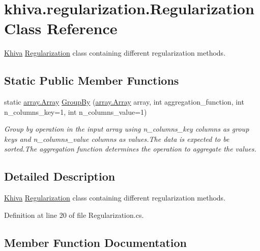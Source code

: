 \hypertarget{classkhiva_1_1regularization_1_1_regularization}{}\section{khiva.\+regularization.\+Regularization Class Reference}
\label{classkhiva_1_1regularization_1_1_regularization}


\mbox{\hyperlink{classkhiva_1_1_khiva}{Khiva}} \mbox{\hyperlink{classkhiva_1_1regularization_1_1_regularization}{Regularization}} class containing different regularization methods.  


\subsection*{Static Public Member Functions}
\begin{DoxyCompactItemize}
\item 
static \mbox{\hyperlink{classkhiva_1_1array_1_1_array}{array.\+Array}} \mbox{\hyperlink{classkhiva_1_1regularization_1_1_regularization_a7d971eb08d562b329e6e93700c7d1e81}{Group\+By}} (\mbox{\hyperlink{classkhiva_1_1array_1_1_array}{array.\+Array}} array, int aggregation\+\_\+function, int n\+\_\+columns\+\_\+key=1, int n\+\_\+columns\+\_\+value=1)
\begin{DoxyCompactList}\small\item\em Group by operation in the input array using n\+\_\+columns\+\_\+key columns as group keys and n\+\_\+columns\+\_\+value columns as values.\+The data is expected to be sorted.\+The aggregation function determines the operation to aggregate the values. \end{DoxyCompactList}\end{DoxyCompactItemize}


\subsection{Detailed Description}
\mbox{\hyperlink{classkhiva_1_1_khiva}{Khiva}} \mbox{\hyperlink{classkhiva_1_1regularization_1_1_regularization}{Regularization}} class containing different regularization methods. 



Definition at line 20 of file Regularization.\+cs.



\subsection{Member Function Documentation}
\mbox{\label{classkhiva_1_1regularization_1_1_regularization_a7d971eb08d562b329e6e93700c7d1e81}} 
